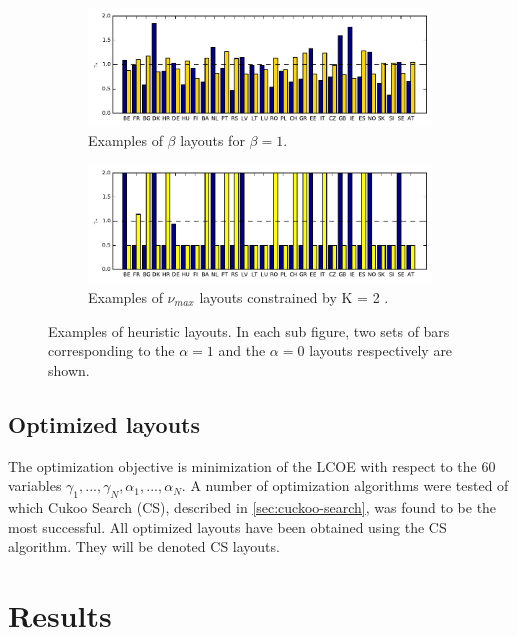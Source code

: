 \documentclass[a4paper, 5p, sort&compress]{elsarticle}%
\newcommand{\chromowidth}{1.00 \columnwidth}
\begin{document}
\begin{figure}[h!]
  \centering
  \begin{subfigure}{2\columnwidth}
    \includegraphics[width = \chromowidth, center]{beta=1}
    \caption{Examples of $\beta$ layouts for $\beta = 1$.}
    \label{fig:betaExamples}    
  \end{subfigure}
  \begin{subfigure}{2\columnwidth}
    \includegraphics[width = \chromowidth, center]{k=2cfMax}
    \caption{Examples of $\nu_{max}$ layouts constrained by K = 2 .}
    \label{fig:cfMaxExamples}    
  \end{subfigure}
  \caption{Examples of heuristic layouts. In each sub figure, two sets of bars
    corresponding to the $\alpha = 1$ and the $\alpha = 0$ layouts respectively
    are shown.}
  \label{fig:examples}
\end{figure}

\subsection{Optimized layouts}
\label{sec:optimized-layouts}

The optimization objective is minimization of the LCOE with respect to
the 60 variables
$\gamma_{1}, ..., \gamma_{N}, \alpha_{1}, ..., \alpha_{N}$.  A number of optimization
algorithms were tested of which Cukoo Search (CS), described in
\cref{sec:cuckoo-search}, was found to be the most successful. All
optimized layouts have been obtained using the CS algorithm. They will
be denoted CS layouts.

\section{Results}
\label{sec:results}
\end{document}
